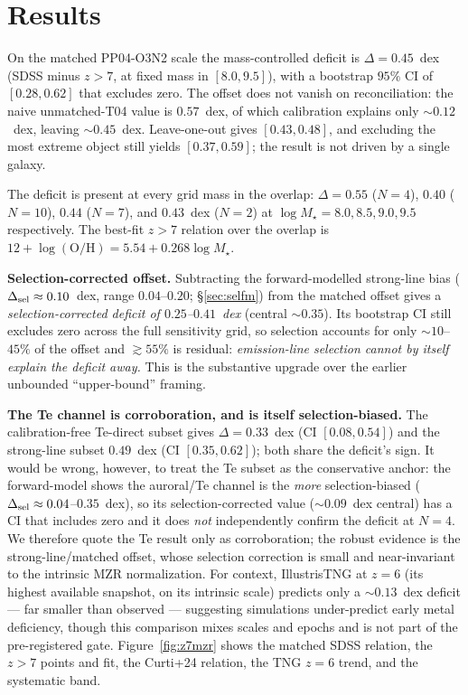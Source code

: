 \documentclass[twocolumn]{aastex631}
\begin{document}
\section{Results}
On the matched PP04-O3N2 scale the mass-controlled deficit is $\Delta=0.45$~dex (SDSS minus $z>7$, at fixed mass in $[8.0,9.5]$), with a bootstrap $95\%$ CI of $[0.28,0.62]$ that excludes zero. The offset does not vanish on reconciliation: the naive unmatched-T04 value is $0.57$~dex, of which calibration explains only $\sim0.12$~dex, leaving $\sim0.45$~dex. Leave-one-out gives $[0.43,0.48]$, and excluding the most extreme object still yields $[0.37,0.59]$; the result is not driven by a single galaxy.

The deficit is present at every grid mass in the overlap: $\Delta=0.55$ ($N=4$), $0.40$ ($N=10$), $0.44$ ($N=7$), and $0.43$~dex ($N=2$) at $\log M_\star=8.0,8.5,9.0,9.5$ respectively. The best-fit $z>7$ relation over the overlap is $12+\log(\mathrm{O/H})=5.54+0.268\log M_\star$.

\textbf{Selection-corrected offset.} Subtracting the forward-modelled strong-line bias ($\Delta_{\rm sel}\approx0.10$~dex, range $0.04$--$0.20$; \S\ref{sec:selfm}) from the matched offset gives a \emph{selection-corrected deficit of $0.25$--$0.41$~dex} (central $\sim0.35$). Its bootstrap CI still excludes zero across the full sensitivity grid, so selection accounts for only $\sim10$--$45\%$ of the offset and $\gtrsim55\%$ is residual: \emph{emission-line selection cannot by itself explain the deficit away.} This is the substantive upgrade over the earlier unbounded ``upper-bound'' framing.

\textbf{The Te channel is corroboration, and is itself selection-biased.} The calibration-free Te-direct subset gives $\Delta=0.33$~dex (CI $[0.08,0.54]$) and the strong-line subset $0.49$~dex (CI $[0.35,0.62]$); both share the deficit's sign. It would be wrong, however, to treat the Te subset as the conservative anchor: the forward-model shows the auroral/Te channel is the \emph{more} selection-biased ($\Delta_{\rm sel}\approx0.04$--$0.35$~dex), so its selection-corrected value ($\sim0.09$~dex central) has a CI that includes zero and it does \emph{not} independently confirm the deficit at $N=4$. We therefore quote the Te result only as corroboration; the robust evidence is the strong-line/matched offset, whose selection correction is small and near-invariant to the intrinsic MZR normalization. For context, IllustrisTNG at $z=6$ (its highest available snapshot, on its intrinsic scale) predicts only a $\sim0.13$~dex deficit --- far smaller than observed --- suggesting simulations under-predict early metal deficiency, though this comparison mixes scales and epochs and is not part of the pre-registered gate. Figure~\ref{fig:z7mzr} shows the matched SDSS relation, the $z>7$ points and fit, the Curti+24 relation, the TNG $z=6$ trend, and the systematic band.
\end{document}
